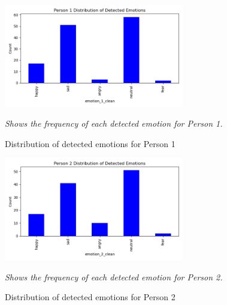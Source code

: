 \documentclass[12pt]{article}
\begin{document}
\begin{figure}[h!]
    \centering
    \includegraphics[width=0.7\textwidth]{model_analysis/Person 1_detected_distribution.png}
    \caption{Distribution of detected emotions for Person 1}
    \textit{Shows the frequency of each detected emotion for Person 1.}
\end{figure}
\begin{figure}[h!]
    \centering
    \includegraphics[width=0.7\textwidth]{model_analysis/Person 2_detected_distribution.png}
    \caption{Distribution of detected emotions for Person 2}
    \textit{Shows the frequency of each detected emotion for Person 2.}
\end{figure}
\end{document}
